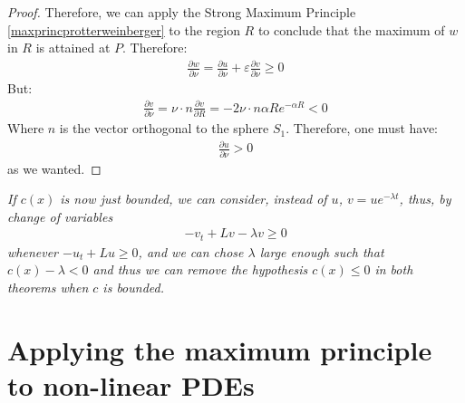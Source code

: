 \begin{proof}
	Therefore, we can apply the Strong Maximum Principle \ref{maxprincprotterweinberger} to the region $R$ to conclude that the maximum of $w$ in $R$ is attained at $P$. Therefore:
	\begin{align*}
		\frac{\partial w}{\partial \nu}=\frac{\partial u}{\partial \nu}+\varepsilon\frac{\partial v}{\partial \nu}\geq0
	\end{align*}
	But:
	\begin{align*}
		\frac{\partial v}{\partial \nu}=\nu \cdot n\frac{\partial v}{\partial R} = - 2\nu \cdot n \alpha Re^{-\alpha R}<0
	\end{align*}
	Where $n$ is the vector orthogonal to the sphere $S_1$. Therefore, one must have:  
	\begin{align*}
		\frac{\partial u}{\partial \nu}>0
	\end{align*}
	as we wanted.
\end{proof}
\begin{oss}\label{removecpositive}
	\em If $c(x)$ is now just bounded, we can consider, instead of $u$, $v= u e^{-\lambda t}$, thus, by change of variables 
	\begin{align*}
		-v_t+Lv-\lambda v \geq 0
	\end{align*}
	whenever $-u_t+Lu\geq 0$, and we can chose $\lambda$ large enough such that $c(x)-\lambda<0$ and thus we can remove the hypothesis $c(x)\leq0$ in both theorems when $c$ is bounded. 
\end{oss}

\section{Applying the maximum principle to non-linear PDEs}

